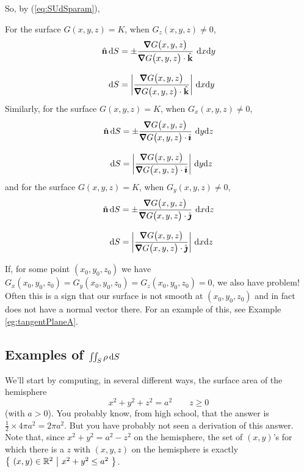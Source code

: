 So, by (\ref{eq:SUdSparam}),
\begin{impeqn}\label{eq:SUdSimplicit}
For the surface $G(x,y,z)=K$, when $G_z(x,y,z)\ne 0$,
\begin{align*}
\hn\, \dee{S} & = 
    \pm\frac{\vnabla G\big(x,y,z\big)}{\vnabla G\big(x,y,z\big)\cdot\hk}\ 
          \dee{x}\dee{y} \\[0.1in]
\dee{S}&= 
\bigg|\frac{\vnabla G\big(x,y,z\big)}{\vnabla G\big(x,y,z\big)\cdot\hk}\bigg|\ 
          \dee{x}\dee{y}
\end{align*}
Similarly, for the surface $G(x,y,z)=K$, when $G_x(x,y,z)\ne 0$,
\begin{align*}
\hn\, \dee{S} & = 
    \pm\frac{\vnabla G\big(x,y,z\big)}{\vnabla G\big(x,y,z\big)\cdot\hi}\ 
          \dee{y}\dee{z} \\[0.1in]
\dee{S}&= 
\bigg|\frac{\vnabla G\big(x,y,z\big)}{\vnabla G\big(x,y,z\big)\cdot\hi}\bigg|\ 
          \dee{y}\dee{z}
\end{align*}
and for the surface $G(x,y,z)=K$, when $G_y(x,y,z)\ne 0$,
\begin{align*}
\hn\, \dee{S} & = 
    \pm\frac{\vnabla G\big(x,y,z\big)}{\vnabla G\big(x,y,z\big)\cdot\hj}\ 
          \dee{x}\dee{z} \\[0.1in]
\dee{S}&= 
\bigg|\frac{\vnabla G\big(x,y,z\big)}{\vnabla G\big(x,y,z\big)\cdot\hj}\bigg|\ 
          \dee{x}\dee{z}
\end{align*}

\end{impeqn}
\noindent
If, for some point $(x_0,y_0,z_0)$ we have 
$G_x(x_0,y_0,z_0)= 
 G_y(x_0,y_0,z_0)= 
 G_z(x_0,y_0,z_0)= 0$, we also have problem! Often this is a sign
that our surface is not smooth at $(x_0,y_0,z_0)$ and in fact does not
have a normal vector there. For an example of this, see 
Example \ref{eg:tangentPlaneA}.


\subsection{Examples of $\iint_S \rho\,\mathrm{d}S$}\label{sec:rhodSexamples}
We'll start by computing, in several different ways, the surface area of the 
hemisphere
\begin{equation*}
x^2+y^2+z^2=a^2\qquad z\ge 0
\end{equation*}
(with $a>0$).
You probably know, from high school, that the answer is 
$\frac{1}{2}\times 4\pi a^2=2\pi a^2$. But you have probably 
not seen a derivation of this answer.
Note that, since $x^2+y^2 = a^2-z^2$ on the hemisphere, the set
of $(x,y)$'s for which there is a $z$ with $(x,y,z)$ on the  hemisphere
is exactly $\big\{ \ (x,y)\in\mathbb{R}^2\ \big|\ x^2+y^2\le a^2\ \big\}$.

